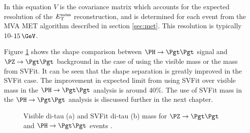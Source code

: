 In this equation $V$ is the covariance matrix which accounts for the expected
resolution of the $E_{\mathrm{T}}^{\text{miss}}$ reconstruction, and is determined for each event from
the MVA MET algorithm described in section \ref{sec:met}. This resolution is
typically $10$-$15\,\GeV$. 

Figure \ref{fig:svfit} shows the shape comparison between $\PH\to\Pgt\Pgt$ signal
and $\PZ \to \Pgt\Pgt$ background in the case of using the visible mass or the mass from SVFit. It can
be seen that the shape separation is greatly improved in the SVFit case.
The improvement in expected limit from using SVFit over visible mass in the $\PH
\to \Pgt\Pgt$ analysis is around 40$\%$. The use of SVFit mass in the
$\PH\to\Pgt\Pgt$ analysis is discussed further in the next chapter.

\begin{figure}[tbh]
\begin{center}
\end{center}
\caption[Di-tau mass for for $\ZToTauTau$ and $\HToTauTau$ events, reconstructed
using the visible products or the SVFit algorithm.]{Visible di-tau (a) and SVFit
di-tau (b) mass for $\ZToTauTau$ and $\HToTauTau$ events \cite{HIG-13-004}.
} 
\label{fig:svfit}
\end{figure}


